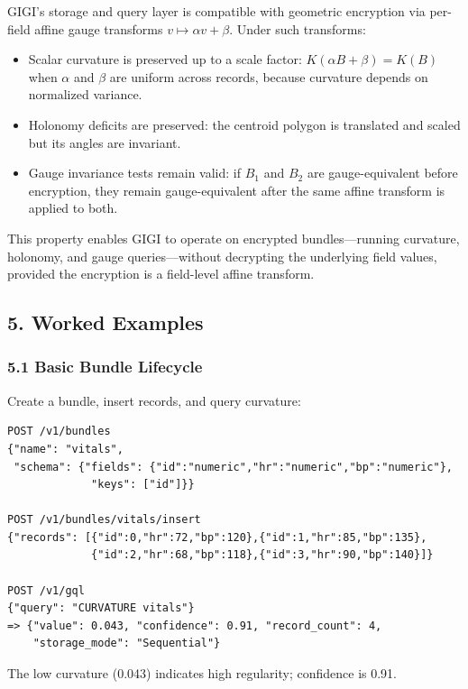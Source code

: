 \documentclass[11pt,letterpaper]{article}
\begin{document}
GIGI's storage and query layer is compatible with geometric encryption via per-field affine gauge transforms $v \mapsto \alpha v + \beta$. Under such transforms:
\begin{itemize}[nosep]
  \item Scalar curvature is preserved up to a scale factor: $K(\alpha B + \beta) = K(B)$ when $\alpha$ and $\beta$ are uniform across records, because curvature depends on normalized variance.
  \item Holonomy deficits are preserved: the centroid polygon is translated and scaled but its angles are invariant.
  \item Gauge invariance tests remain valid: if $B_1$ and $B_2$ are gauge-equivalent before encryption, they remain gauge-equivalent after the same affine transform is applied to both.
\end{itemize}
This property enables GIGI to operate on encrypted bundles---running curvature, holonomy, and gauge queries---without decrypting the underlying field values, provided the encryption is a field-level affine transform.


\subsection*{5. Worked Examples}

\subsubsection*{5.1 Basic Bundle Lifecycle}

Create a bundle, insert records, and query curvature:

\begin{lstlisting}
POST /v1/bundles
{"name": "vitals",
 "schema": {"fields": {"id":"numeric","hr":"numeric","bp":"numeric"},
             "keys": ["id"]}}

POST /v1/bundles/vitals/insert
{"records": [{"id":0,"hr":72,"bp":120},{"id":1,"hr":85,"bp":135},
             {"id":2,"hr":68,"bp":118},{"id":3,"hr":90,"bp":140}]}

POST /v1/gql
{"query": "CURVATURE vitals"}
=> {"value": 0.043, "confidence": 0.91, "record_count": 4,
    "storage_mode": "Sequential"}
\end{lstlisting}

The low curvature (0.043) indicates high regularity; confidence is 0.91.
\end{document}
